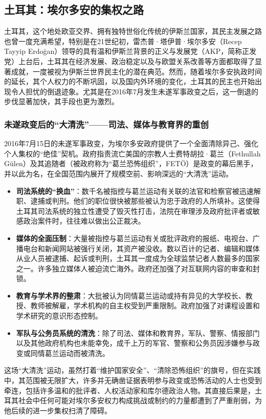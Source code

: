 \documentclass[UTF8, 10pt]{ctexbook}
\begin{document}
\subsection{土耳其：埃尔多安的集权之路}
土耳其，这个地处欧亚交界、拥有独特世俗化传统的伊斯兰国家，其民主发展之路也曾一度充满希望，特别是在21世纪初，雷杰普·塔伊普·埃尔多安（Recep Tayyip Erdoğan）领导的具有温和伊斯兰背景的正义与发展党（AKP，简称正发党）上台后，土耳其在经济发展、政治稳定以及与欧盟关系改善等方面都取得了显著成就，一度被视为伊斯兰世界民主化的潜在典范。然而，随着埃尔多安执政时间的延长，其个人权力的不断巩固，以及国内外环境的变化，土耳其的民主也开始出现令人担忧的倒退迹象。尤其是在2016年7月发生未遂军事政变之后，这一倒退的步伐显著加快，其手段也更为激烈。

\subsubsection{未遂政变后的“大清洗”——司法、媒体与教育界的重创}
2016年7月15日的未遂军事政变，为埃尔多安政府提供了一个全面清除异己、强化个人集权的“绝佳”契机。政府指责流亡美国的宗教人士费特胡拉·葛兰（Fethullah Gülen）及其追随者（被政府称为“葛兰恐怖组织”，FETÖ）是政变的幕后黑手，并以此为名，在全国范围内展开了规模空前、影响深远的“大清洗”运动。
\begin{itemize}
    \item \textbf{司法系统的“换血”}：数千名被指控与葛兰运动有关联的法官和检察官被迅速解职、逮捕或判刑。他们的职位很快被那些被认为忠于政府的人所填补。这使得土耳其司法系统的独立性遭受了毁灭性打击，法院在审理涉及政府批评者或敏感政治案件时，往往难以做出公正裁决。
    \item \textbf{媒体的全面压制}：大量被指控与葛兰运动有关或批评政府的报纸、电视台、广播电台和新闻网站被强行关闭，其资产被没收。数以百计的记者、编辑和媒体从业人员被逮捕、起诉或判刑，土耳其一度成为全球监禁记者人数最多的国家之一。许多独立媒体人被迫流亡海外。政府还加强了对互联网内容的审查和封锁。
    \item \textbf{教育与学术界的整肃}：大批被认为同情葛兰运动或持有异见的大学校长、教授、教师被解雇，学术机构的自主权受到严重限制。政府加强了对课程设置和学术研究的意识形态控制。
    \item \textbf{军队与公务员系统的清洗}：除了司法、媒体和教育界，军队、警察、情报部门以及其他政府机构也未能幸免，成千上万的军官、警察和公务员因涉嫌参与政变或同情葛兰运动而被清洗。
\end{itemize}
这场“大清洗”运动，虽然打着“维护国家安全”、“清除恐怖组织”的旗号，但在实践中，其范围被无限扩大，许多并无确凿证据表明参与政变或恐怖活动的人士也受到牵连，包括许多温和的批评者、人权活动家和库尔德政治人物。其直接后果是，土耳其社会中任何可能对埃尔多安权力构成挑战或制约的力量都遭到了严重削弱，为他后续的进一步集权扫清了障碍。
\end{document}
